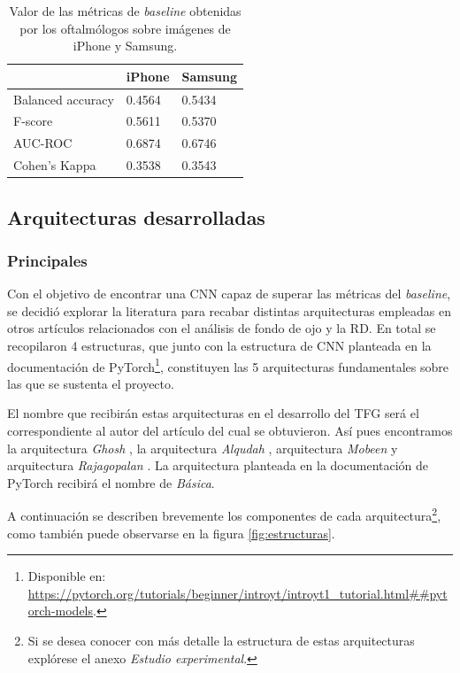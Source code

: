 \begin{table}[]
\centering
\begin{tabular}{@{}lll@{}}
\toprule
\rowcolor[HTML]{C0C0C0}
                  & iPhone & Samsung \\ \midrule
Balanced accuracy & 0.4564 & 0.5434  \\
F-score           & 0.5611 & 0.5370  \\
AUC-ROC           & 0.6874 & 0.6746  \\
Cohen's Kappa     & 0.3538 & 0.3543  \\ \bottomrule
\end{tabular}
\caption{Valor de las métricas de \textit{baseline} obtenidas por los oftalmólogos sobre imágenes de iPhone y Samsung.}
\label{tab:baseline}
\end{table}

\subsection{Arquitecturas desarrolladas}

\subsubsection{Principales}

Con el objetivo de encontrar una CNN capaz de superar las métricas del \textit{baseline}, se decidió explorar la literatura para recabar distintas arquitecturas empleadas en otros artículos relacionados con el análisis de fondo de ojo y la RD. En total se recopilaron 4 estructuras, que junto con la estructura de CNN planteada en la documentación de PyTorch\footnote{Disponible en: \url{https://pytorch.org/tutorials/beginner/introyt/introyt1_tutorial.html##pytorch-models}.}, constituyen las 5 arquitecturas fundamentales sobre las que se sustenta el proyecto.

El nombre que recibirán estas arquitecturas en el desarrollo del TFG será el correspondiente al autor del artículo del cual se obtuvieron. Así pues encontramos la arquitectura \textit{Ghosh} \cite{CNNarch:Ghosh}, la arquitectura \textit{Alqudah} \cite{CNNarch:Alqudah}, arquitectura \textit{Mobeen} \cite{CNNarch:Mobeen} y arquitectura \textit{Rajagopalan} \cite{CNNarch:Rajagopalan}. La arquitectura planteada en la documentación de PyTorch recibirá el nombre de \textit{Básica}.

A continuación se describen brevemente los componentes de cada arquitectura\footnote{Si se desea conocer con más detalle la estructura de estas arquitecturas explórese el anexo \textit{Estudio experimental}.}, como también puede observarse en la figura \ref{fig:estructuras}.

